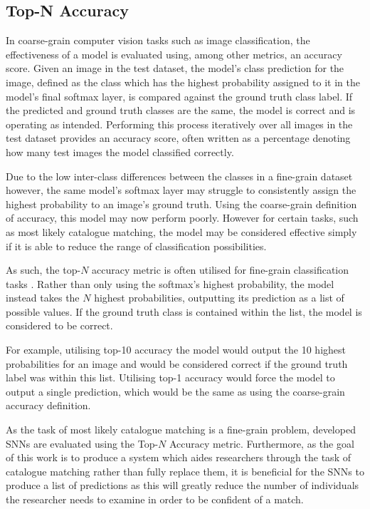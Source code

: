 \subsection{Top-N Accuracy}\label{ch:ID,sec:SNNBackground,subsec:TopNAccuracy}

In coarse-grain computer vision tasks such as image classification, the effectiveness of a model is evaluated using, among other metrics, an accuracy score. Given an image in the test dataset, the model's class prediction for the image, defined as the class which has the highest probability assigned to it in the model's final softmax layer, is compared against the ground truth class label. If the predicted and ground truth classes are the same, the model is correct and is operating as intended. Performing this process iteratively over all images in the test dataset provides an accuracy score, often written as a percentage denoting how many test images the model classified correctly.

Due to the low inter-class differences between the classes in a fine-grain dataset however, the same model's softmax layer may struggle to consistently assign the highest probability to an image's ground truth. Using the coarse-grain definition of accuracy, this model may now perform poorly. However for certain tasks, such as most likely catalogue matching, the model may be considered effective simply if it is able to reduce the range of classification possibilities.

As such, the top-$N$ accuracy metric is often utilised for fine-grain classification tasks \cite{yang_large-scale_2015, gao_towards_2021, brust_towards_2017}. Rather than only using the softmax's highest probability, the model instead takes the $N$ highest probabilities, outputting its prediction as a list of possible values. If the ground truth class is contained within the list, the model is considered to be correct. 

For example, utilising top-10 accuracy the model would output the 10 highest probabilities for an image and would be considered correct if the ground truth label was within this list. Utilising top-1 accuracy would force the model to output a single prediction, which would be the same as using the coarse-grain accuracy definition. 

As the task of most likely catalogue matching is a fine-grain problem, developed SNNs are evaluated using the Top-$N$ Accuracy metric. Furthermore, as the goal of this work is to produce a system which aides researchers through the task of catalogue matching rather than fully replace them, it is beneficial for the SNNs to produce a list of predictions as this will greatly reduce the number of individuals the researcher needs to examine in order to be confident of a match.

